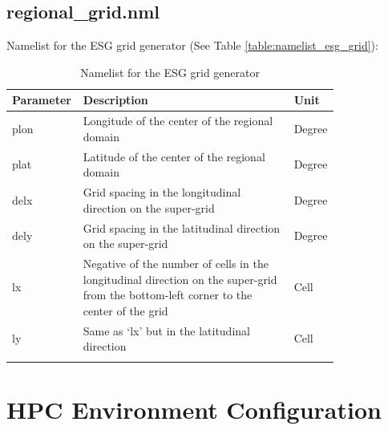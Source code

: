 \documentclass[11pt,fleqn]{report}              %
\begin{document}
\subsection{regional\_grid.nml}
\label{subsec:temp_esggrid}

Namelist for the ESG grid generator (See Table \ref{table:namelist_esg_grid}):
{
\fontsize{10}{12}\selectfont
\begin{longtable}{p{0.1\linewidth} | p{0.63\linewidth} | p{0.08\linewidth} }
\hline
\hline
Parameter & Description & Unit \\
\hline
 plon & Longitude of the center of the regional domain & Degree \\
 plat & Latitude of the center of the regional domain & Degree \\
 delx & Grid spacing in the longitudinal direction on the super-grid & Degree \\
 dely & Grid spacing in the latitudinal direction on the super-grid & Degree \\
 lx & Negative of the number of cells in the longitudinal direction on the super-grid from the bottom-left corner to the center of the grid & Cell \\
 ly & Same as `lx' but in the latitudinal direction & Cell \\
\hline
\caption{Namelist for the ESG grid generator}
\label{table:esg_grid_nml}
\end{longtable}
}






\section{HPC Environment Configuration}
\label{sec:config_hpc}
\end{document}
